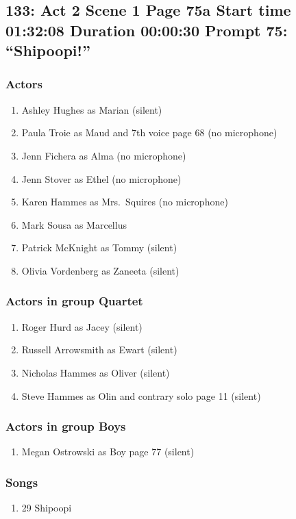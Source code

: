 \subsection{133: Act 2 Scene 1 Page 75a Start time 01:32:08 Duration 00:00:30 Prompt 75: ``Shipoopi!''}

\subsubsection{Actors}
\begin{enumerate}
\item Ashley Hughes as Marian (silent)
\item Paula Troie as Maud and 7th voice page 68 (no microphone)
\item Jenn Fichera as Alma (no microphone)
\item Jenn Stover as Ethel (no microphone)
\item Karen Hammes as Mrs.~Squires (no microphone)
\item Mark Sousa as Marcellus
\item Patrick McKnight as Tommy (silent)
\item Olivia Vordenberg as Zaneeta (silent)
\end{enumerate}
\subsubsection{Actors in group Quartet}
\begin{enumerate}
\item Roger Hurd as Jacey (silent)
\item Russell Arrowsmith as Ewart (silent)
\item Nicholas Hammes as Oliver (silent)
\item Steve Hammes as Olin and contrary solo page 11 (silent)
\end{enumerate}
\subsubsection{Actors in group Boys}
\begin{enumerate}
\item Megan Ostrowski as Boy page 77 (silent)
\end{enumerate}

\subsubsection{Songs}
\begin{enumerate}
\item 29 Shipoopi
\end{enumerate}
